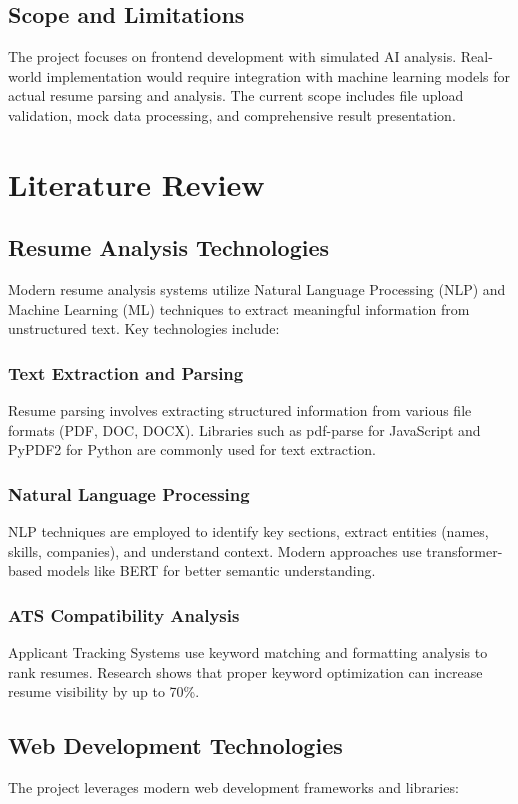 \documentclass[12pt,a4paper]{article}
\begin{document}
\subsection{Scope and Limitations}
The project focuses on frontend development with simulated AI analysis. Real-world implementation would require integration with machine learning models for actual resume parsing and analysis. The current scope includes file upload validation, mock data processing, and comprehensive result presentation.

\section{Literature Review}

\subsection{Resume Analysis Technologies}
Modern resume analysis systems utilize Natural Language Processing (NLP) and Machine Learning (ML) techniques to extract meaningful information from unstructured text. Key technologies include:

\subsubsection{Text Extraction and Parsing}
Resume parsing involves extracting structured information from various file formats (PDF, DOC, DOCX). Libraries such as pdf-parse for JavaScript and PyPDF2 for Python are commonly used for text extraction.

\subsubsection{Natural Language Processing}
NLP techniques are employed to identify key sections, extract entities (names, skills, companies), and understand context. Modern approaches use transformer-based models like BERT for better semantic understanding.

\subsubsection{ATS Compatibility Analysis}
Applicant Tracking Systems use keyword matching and formatting analysis to rank resumes. Research shows that proper keyword optimization can increase resume visibility by up to 70\%.

\subsection{Web Development Technologies}
The project leverages modern web development frameworks and libraries:
\end{document}
